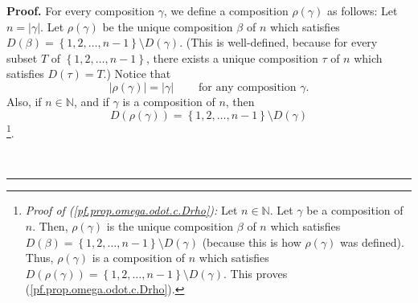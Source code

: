\documentclass[numbers=enddot,12pt,final,onecolumn,notitlepage,abstracton]{scrartcl}%
\theoremstyle{definition}
\newenvironment{proof}[1][Proof]{\noindent\textbf{#1.} }{\ \rule{0.5em}{0.5em}}
\newenvironment{verlong}{}{}
\begin{document}
\begin{verlong}
\begin{proof}
For every composition $\gamma$, we define a composition $\rho\left(
\gamma\right)  $ as follows: Let $n=\left\vert \gamma\right\vert $. Let
$\rho\left(  \gamma\right)  $ be the unique composition $\beta$ of $n$ which
satisfies $D\left(  \beta\right)  =\left\{  1,2,\ldots,n-1\right\}  \setminus
D\left(  \gamma\right)  $. (This is well-defined, because for every subset $T$
of $\left\{  1,2,\ldots,n-1\right\}  $, there exists a unique composition
$\tau$ of $n$ which satisfies $D\left(  \tau\right)  =T$.) Notice that%
\begin{equation}
\left\vert \rho\left(  \gamma\right)  \right\vert =\left\vert \gamma
\right\vert \ \ \ \ \ \ \ \ \ \ \text{for any composition }\gamma.
\label{pf.prop.omega.odot.rho1}%
\end{equation}
Also, if $n\in\mathbb{N}$, and if $\gamma$ is a composition of $n$, then%
\begin{equation}
D\left(  \rho\left(  \gamma\right)  \right)  =\left\{  1,2,\ldots,n-1\right\}
\setminus D\left(  \gamma\right)  \label{pf.prop.omega.odot.c.Drho}%
\end{equation}
\footnote{\textit{Proof of (\ref{pf.prop.omega.odot.c.Drho}):} Let
$n\in\mathbb{N}$. Let $\gamma$ be a composition of $n$. Then, $\rho\left(
\gamma\right)  $ is the unique composition $\beta$ of $n$ which satisfies
$D\left(  \beta\right)  =\left\{  1,2,\ldots,n-1\right\}  \setminus D\left(
\gamma\right)  $ (because this is how $\rho\left(  \gamma\right)  $ was
defined). Thus, $\rho\left(  \gamma\right)  $ is a composition of $n$ which
satisfies $D\left(  \rho\left(  \gamma\right)  \right)  =\left\{
1,2,\ldots,n-1\right\}  \setminus D\left(  \gamma\right)  $. This proves
(\ref{pf.prop.omega.odot.c.Drho}).}.


\end{proof}
\end{verlong}
\end{document}
